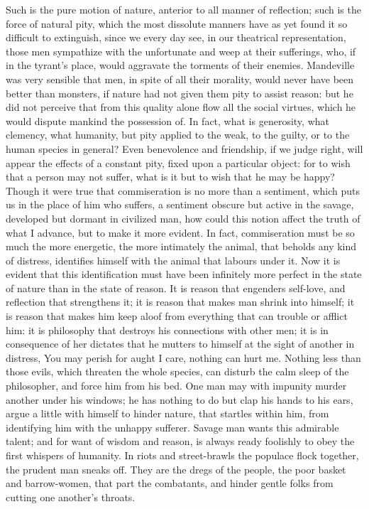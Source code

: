 \documentclass[11pt,twocolumn]{ltugboat}
\begin{document}
Such is the pure motion of nature, anterior to all manner of
reflection; such is the force of natural pity, which the most
dissolute manners have as yet found it so difficult to extinguish,
since we every day see, in our theatrical representation, those men
sympathize with the unfortunate and weep at their sufferings, who, if
in the tyrant's place, would aggravate the torments of their enemies.
Mandeville was very sensible that men, in spite of all their morality,
would never have been better than monsters, if nature had not given
them pity to assist reason: but he did not perceive that from this
quality alone flow all the social virtues, which he would dispute
mankind the possession of. In fact, what is generosity, what clemency,
what humanity, but pity applied to the weak, to the guilty, or to the
human species in general? Even benevolence and friendship, if we judge
right, will appear the effects of a constant pity, fixed upon a
particular object: for to wish that a person may not suffer, what is
it but to wish that he may be happy? Though it were true that
commiseration is no more than a sentiment, which puts us in the place
of him who suffers, a sentiment obscure but active in the savage,
developed but dormant in civilized man, how could this notion affect
the truth of what I advance, but to make it more evident. In fact,
commiseration must be so much the more energetic, the more intimately
the animal, that beholds any kind of distress, identifies himself with
the animal that labours under it. Now it is evident that this
identification must have been infinitely more perfect in the state of
nature than in the state of reason. It is reason that engenders
self-love, and reflection that strengthens it; it is reason that makes
man shrink into himself; it is reason that makes him keep aloof from
everything that can trouble or afflict him: it is philosophy that
destroys his connections with other men; it is in consequence of her
dictates that he mutters to himself at the sight of another in
distress, You may perish for aught I care, nothing can hurt me.
Nothing less than those evils, which threaten the whole species, can
disturb the calm sleep of the philosopher, and force him from his bed.
One man may with impunity murder another under his windows; he has
nothing to do but clap his hands to his ears, argue a little with
himself to hinder nature, that startles within him, from identifying
him with the unhappy sufferer. Savage man wants this admirable talent;
and for want of wisdom and reason, is always ready foolishly to obey
the first whispers of humanity. In riots and street-brawls the
populace flock together, the prudent man sneaks off. They are the
dregs of the people, the poor basket and barrow-women, that part the
combatants, and hinder gentle folks from cutting one another's
throats.
\end{document}
